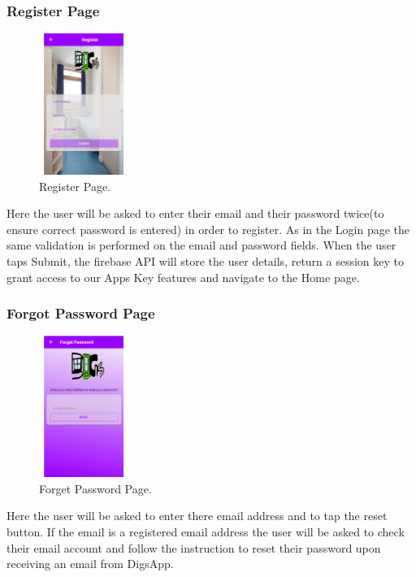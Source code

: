 \subsubsection{Register Page}

\begin{figure}[h]
\centering
\includegraphics[width=2.9cm, height=4.6cm]{img/Register}
\caption{Register Page.}
\end{figure}

\noindent Here the user will be asked to enter their email and their password twice(to ensure correct password is entered) in order to register. As in the Login page the same validation is performed on the email and password fields. When the user taps Submit, the firebase API will store the user details, return a session key to grant access to our Apps Key features and navigate to the Home page.

\subsubsection{Forgot Password Page}

\begin{figure}[h]
\centering
\includegraphics[width=2.9cm, height=4.6cm]{img/Forget}
\caption{Forget Password Page.}
\end{figure}

\noindent Here the user will be asked to enter there email address and to tap the reset button. If the email is a registered email address the user will be asked to check their email account and follow the instruction to reset their password upon receiving an email from DigsApp.

